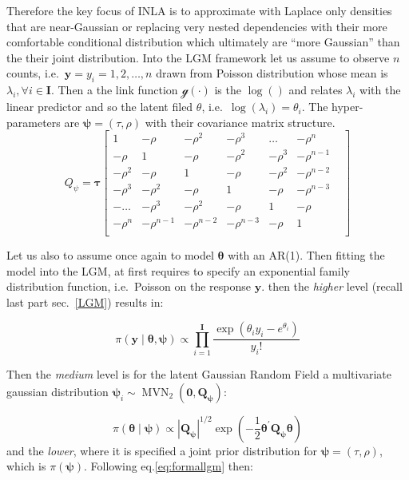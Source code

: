 \documentclass[
  12pt,
  a4paper,
  oneside]{book}
\theoremstyle{definition}
\theoremstyle{definition}
\theoremstyle{definition}
\theoremstyle{remark}
\begin{document}
Therefore the key focus of INLA is to approximate with Laplace only densities that are near-Gaussian \citeyearpar{wang2018bayesian} or replacing very nested dependencies with their more comfortable conditional distribution which ultimately are ``more Gaussian'' than the their joint distribution.
Into the LGM framework let us assume to observe \(n\) counts, i.e.~\(\mathbf{y} = y_i = 1,2, \ldots, n\) drawn from Poisson distribution whose mean is \(\lambda_i, \forall i \in \mathbf{I}\). Then a the link function \(\mathscr{g}(\cdot)\) is the \(\log()\) and relates \(\lambda_i\) with the linear predictor and so the latent filed \(\theta\), i.e.~\(\log(\lambda_i)=\theta_{i}\). The hyper-parameters are \(\boldsymbol\psi = (\tau, \rho)\) with their covariance matrix structure.
\[
Q_{\psi}=\boldsymbol\tau\begin{bmatrix}
1 & - \rho & - \rho^{2} & - \rho^{3} & \ldots & - \rho^{n} &  \\
- \rho & 1 & - \rho & - \rho^{2} & - \rho^{3} & - \rho^{n-1} & \\
- \rho^{2} & - \rho & 1 & - \rho & - \rho^{2} & - \rho^{n-2} &  \\
- \rho^{3} & - \rho^{2} & - \rho & 1 & - \rho & - \rho^{n-3} &  \\
- \ldots & - \rho^{3} & - \rho^{2} & - \rho & 1 & - \rho &  \\
- \rho^{n} & - \rho^{n-1} & - \rho^{n-2} & - \rho^{n-3} & - \rho & 1 \\
\end{bmatrix}
\]

Let us also to assume once again to model \(\boldsymbol\theta\) with an AR(1).
Then fitting the model into the LGM, at first requires to specify an exponential family distribution function, i.e.~Poisson on the response \(\mathbf{y}\).
then the \emph{higher} level (recall last part sec.~\ref{LGM}) results in:

\[
\pi(\boldsymbol{\mathbf{y}} \mid \boldsymbol{\theta} , \boldsymbol{\psi}) \propto\prod_{i=1}^{\mathbf{I}} \frac{ \exp \left(\theta_{i} y_{i}-e^{\theta_{i}}\right) }{y_{i} !}
\]

Then the \emph{medium} level is for the latent Gaussian Random Field a multivariate gaussian distribution \(\boldsymbol{\psi}_{i} \sim \operatorname{MVN}_{2}(\mathbf{0}, \boldsymbol{Q}_{\boldsymbol{\psi}})\):

\[
\pi(\boldsymbol{\theta} \mid \boldsymbol{\psi}) \propto\left|\boldsymbol{Q}_{\boldsymbol{\psi}}\right|^{1 / 2} \exp \left(-\frac{1}{2} \boldsymbol{\theta}^{\prime} \boldsymbol{Q}_{\boldsymbol{\psi}} \boldsymbol{\theta}\right)
\]
and the \emph{lower}, where it is specified a joint prior distribution for \(\boldsymbol\psi = (\tau, \rho)\), which is \(\pi(\boldsymbol\psi)\). Following eq.\eqref{eq:formallgm} then:
\end{document}
